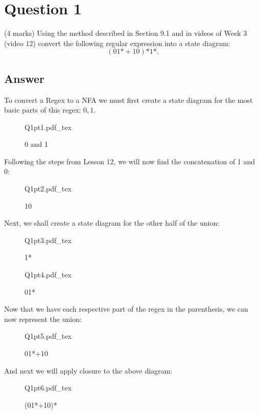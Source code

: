 \documentclass[12pt]{book}
\title{\coursetitle\linebreak\lecturename}
\author{\\Cain Susko\\ 
           \\ \\ \\
      Queen's University 
    \\School of Computing\\}
\newcommand{\incfig}[1]{%
    {#1.pdf_tex}
}
\begin{document}
\begin{titlepage}
        \maketitle
\end{titlepage}


\section*{Question 1}
(4 marks) Using the method described in Section 9.1 and in videos of Week 3 (video 12)
convert the following regular expression into a state diagram:
\[
        (01\text{*}+10)\text{*}1\text{*}
.\] 
\subsection*{Answer}
To convert a Regex to a NFA we must first create a state diagram for the most basic parts of this regex:
        $0,1$.
 \begin{figure}[h]
         \centering
         \incfig{Q1pt1}
         \caption{0 and 1}
\end{figure}

Following the steps from Lesson 12, we will now find the concatenation of 1 and 0:

\begin{figure}[h]
        \centering
        \incfig{Q1pt2}
         \caption{10}
\end{figure}
\pagebreak

Next, we shall create a state diagram for the other half of the union:
\begin{figure}[h]
        \centering
        \incfig{Q1pt3}
        \caption{1*}
\end{figure}
\begin{figure}[h]
        \centering
        \incfig{Q1pt4}
        \caption{01*}
\end{figure}
\pagebreak


Now that we have each respective part of the regex in the parenthesis, we can now represent the union:
\begin{figure}[h]
        \centering
        \incfig{Q1pt5}
        \caption{01*+10}
\end{figure}

And next we will apply closure to the above diagram:
\begin{figure}[h]
        \centering
        \incfig{Q1pt6}
        \caption{(01*+10)*}
\end{figure}
\pagebreak
\end{document}
